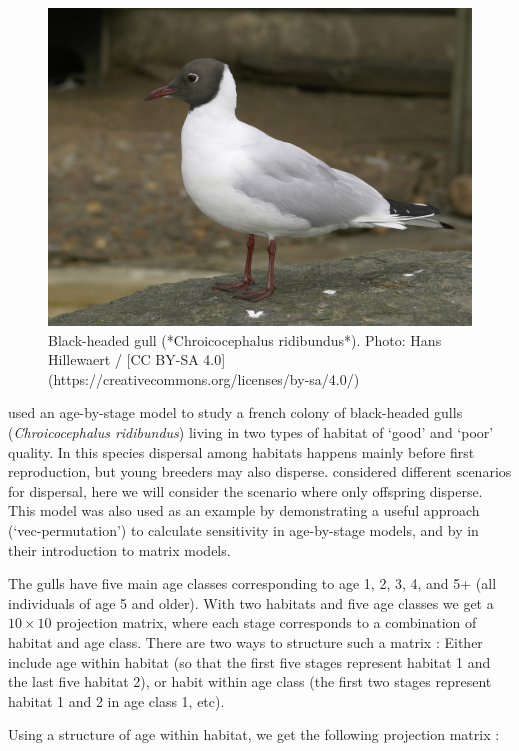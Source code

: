 \documentclass[
]{book}
\begin{document}
\begin{figure}
\includegraphics[width=0.6\linewidth]{BlackHeadedGull} \caption{Black-headed gull (*Chroicocephalus ridibundus*). Photo: Hans Hillewaert / [CC BY-SA 4.0](https://creativecommons.org/licenses/by-sa/4.0/)}\label{fig:BlackHeadedGull}
\end{figure}

\citet{Lebreton2} used an age-by-stage model to study a french colony of black-headed gulls (\emph{Chroicocephalus ridibundus}) living in two types of habitat of `good' and `poor' quality. In this species dispersal among habitats happens mainly before first reproduction, but young breeders may also disperse. \citet{Lebreton2} considered different scenarios for dispersal, here we will consider the scenario where only offspring disperse. This model was also used as an example by \citet{Hunter2} demonstrating a useful approach (`vec-permutation') to calculate sensitivity in age-by-stage models, and by \citet{Vindenes2020} in their introduction to matrix models.

The gulls have five main age classes corresponding to age 1, 2, 3, 4, and 5+ (all individuals of age 5 and older). With two habitats and five age classes we get a \(10\times 10\) projection matrix, where each stage corresponds to a combination of habitat and age class. There are two ways to structure such a matrix \citep{Lebreton2}: Either include age within habitat (so that the first five stages represent habitat 1 and the last five habitat 2), or habit within age class (the first two stages represent habitat 1 and 2 in age class 1, etc).

Using a structure of age within habitat, we get the following projection matrix \citep{Vindenes2020}:
\end{document}
